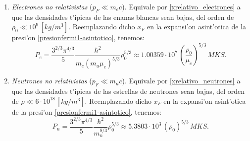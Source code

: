 \begin{enumerate}
\begin{enumerate}
\item \emph{Electrones no relativistas} ($p_F\ll m_{e}c$). Equivale por  \eqref{xrelativo_electrones} a que las densidades t'ipicas de las enanas blancas sean bajas, del orden de $\rho_0\ll10^{9}\,[kg/m^3]$. Reemplazando dicho $x_F$ en la expansi'on asint'otica de la presi'on \eqref{presionfermi1-asintotico}, tenemos:
\begin{equation}\label{fermi_norelativista}
 \boxed{P_e=\frac{3^{2/3}\pi^{4/3}}{5}\frac{\hbar^2}{m_e(m_u\mu_e)^{5/3}}\rho_0^{5/3}\approx1.00359\cdot 10^{7}\,\left(\frac{\rho_0}{\mu_e}\right)^{5/3}\,MKS.}
\end{equation}

\item \emph{Neutrones no relativistas} ($p_F\ll m_{n}c$). Equivale por  \eqref{xrelativo_neutrones} a que las densidades t'ipicas de las estrellas de neutrones sean bajas, del orden de $\rho\ll6\cdot10^{18}\,[kg/m^3]$.  Reemplazando dicho $x_F$ en la expansi'on asint'otica de la presi'on \eqref{presionfermi1-asintotico}, tenemos:
\begin{equation}\label{fermi_norelativista2}
 \boxed{P_n=\frac{3^{2/3}\pi^{4/3}}{5}\frac{\hbar^2}{m_n^{8/3}}\rho_0^{5/3}\approx5.3803\cdot 10^{3}\,\left(\rho_0\right)^{5/3}\,MKS.}
\end{equation}


\end{enumerate}
\end{enumerate}
